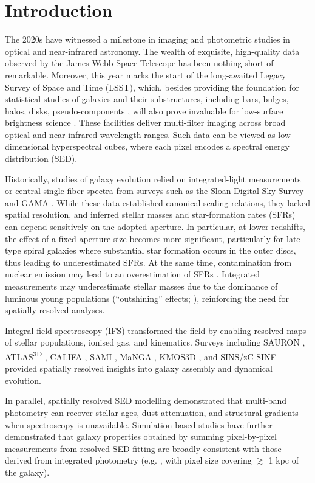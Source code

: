\documentclass[fleqn,usenatbib]{mnras}
\begin{document}
\section{Introduction}
The 2020s have witnessed a milestone in imaging and photometric studies in optical and near-infrared astronomy. The wealth of exquisite, high-quality data observed by the James Webb Space Telescope has been nothing short of remarkable. Moreover, this year marks the start of the long-awaited Legacy Survey of Space and Time (LSST), which, besides providing the foundation for statistical studies of galaxies and their substructures, including bars, bulges, halos, disks, pseudo-components \citep{Binney2008,Simard2011}, will also prove invaluable for low-surface brightness science \citep{Englert25}.
These facilities deliver multi-filter imaging across broad optical and near-infrared wavelength ranges. Such data can be viewed as low-dimensional hyperspectral cubes, where each pixel encodes a spectral energy distribution (SED).

Historically, studies of galaxy evolution relied on integrated-light measurements or central single-fiber spectra from surveys such as the Sloan Digital Sky Survey \citep{York2000} and GAMA \citep[Galaxy and Mass Assembly,][]{Driver2009}. While these data established canonical scaling relations, they lacked spatial resolution, and inferred stellar masses and star-formation rates (SFRs) can depend sensitively on the adopted aperture. In particular, at lower redshifts, the effect of a fixed aperture size becomes more significant, particularly for late-type spiral galaxies where substantial star formation occurs in the outer discs, thus leading to underestimated SFRs. At the same time, contamination from nuclear emission may lead to an overestimation of SFRs \citep{2016richards_SAMI}. Integrated measurements may underestimate stellar masses due to the dominance of luminous young populations (“outshining” effects; \citealt{Sorba2015}), reinforcing the need for spatially resolved analyses. 

Integral-field spectroscopy (IFS) transformed the field by enabling resolved maps of stellar populations, ionised gas, and kinematics. Surveys including SAURON \citep{deZeeuw02}, ATLAS\textsuperscript{3D} \citep{Cappellari2011}, CALIFA \citep{Sanchez2012}, SAMI \citep{SAMIDR3_2021}, MaNGA \citep{Bundy2015}, KMOS3D \citep{Wisnioski2019}, and SINS/zC-SINF \citep{Forster2018} provided spatially resolved insights into galaxy assembly and dynamical evolution. 

In parallel, spatially resolved SED modelling \citep{Abdurro2018} demonstrated that multi-band photometry can recover stellar ages, dust attenuation, and structural gradients when spectroscopy is unavailable. Simulation-based studies have further demonstrated that galaxy properties obtained by summing pixel-by-pixel measurements from resolved SED fitting are broadly consistent with those derived from integrated photometry (e.g. \citealt{2018Smith}, with pixel size covering $\gtrsim$ 1 kpc of the galaxy).
\end{document}

